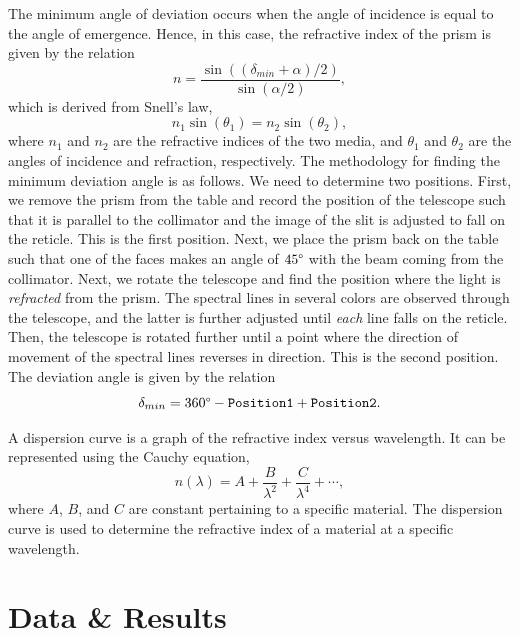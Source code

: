 \documentclass[10pt]{article}
\begin{document}
The minimum angle of deviation occurs when the angle of incidence is equal to the angle of emergence. Hence, in this case, the refractive index of the prism is given by the relation
\begin{equation}
    \label{eq:1}
    n = \frac{\sin\left((\delta_{min}+\alpha) / 2 \right)}{\sin\left(\alpha / 2\right)},
\end{equation}
which is derived from Snell's law,
\begin{equation}
    n_1 \sin(\theta_1) = n_2 \sin(\theta_2),
\end{equation}
where $n_1$ and $n_2$ are the refractive indices of the two media, and $\theta_1$ and $\theta_2$ are the angles of incidence and refraction, respectively. The methodology for finding the minimum deviation angle is as follows. We need to determine two positions. First, we remove the prism from the table and record the position of the telescope such that it is parallel to the collimator and the image of the slit is adjusted to fall on the reticle. This is the first position. Next, we place the prism back on the table such that one of the faces makes an angle of $45\degree$ with the beam coming from the collimator. Next, we rotate the telescope and find the position where the light is \textit{refracted} from the prism. The spectral lines in several colors are observed through the telescope, and the latter is further adjusted until \textit{each} line falls on the reticle. Then, the telescope is rotated further until a point where the direction of movement of the spectral lines reverses in direction. This is the second position. The deviation angle is given by the relation
\begin{equation}
    \delta_{min} = 360\degree - \texttt{Position1} + \texttt{Position2}.
\end{equation}

A dispersion curve is a graph of the refractive index versus wavelength. It can be represented using the Cauchy equation,
\begin{equation}
    n(\lambda) = A + \frac{B}{\lambda^2} + \frac{C}{\lambda^4} + \cdots,
\end{equation}
where $A$, $B$, and $C$ are constant pertaining to a specific material. The dispersion curve is used to determine the refractive index of a material at a specific wavelength.

\section{Data \& Results}
\end{document}
